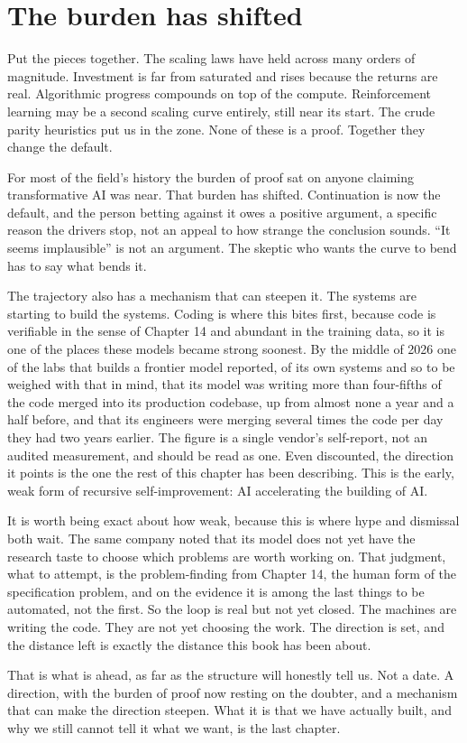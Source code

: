 \section*{The burden has shifted}

Put the pieces together. The scaling laws have held across many orders of magnitude. Investment is far from saturated and rises because the returns are real. Algorithmic progress compounds on top of the compute. Reinforcement learning may be a second scaling curve entirely, still near its start. The crude parity heuristics put us in the zone. None of these is a proof. Together they change the default.

For most of the field's history the burden of proof sat on anyone claiming transformative AI was near. That burden has shifted. Continuation is now the default, and the person betting against it owes a positive argument, a specific reason the drivers stop, not an appeal to how strange the conclusion sounds. ``It seems implausible'' is not an argument. The skeptic who wants the curve to bend has to say what bends it.

The trajectory also has a mechanism that can steepen it. The systems are starting to build the systems. Coding is where this bites first, because code is verifiable in the sense of Chapter 14 and abundant in the training data, so it is one of the places these models became strong soonest. By the middle of 2026 one of the labs that builds a frontier model reported, of its own systems and so to be weighed with that in mind, that its model was writing more than four-fifths of the code merged into its production codebase, up from almost none a year and a half before, and that its engineers were merging several times the code per day they had two years earlier. The figure is a single vendor's self-report, not an audited measurement, and should be read as one. Even discounted, the direction it points is the one the rest of this chapter has been describing. This is the early, weak form of recursive self-improvement: AI accelerating the building of AI.

It is worth being exact about how weak, because this is where hype and dismissal both wait. The same company noted that its model does not yet have the research taste to choose which problems are worth working on. That judgment, what to attempt, is the problem-finding from Chapter 14, the human form of the specification problem, and on the evidence it is among the last things to be automated, not the first. So the loop is real but not yet closed. The machines are writing the code. They are not yet choosing the work. The direction is set, and the distance left is exactly the distance this book has been about.

That is what is ahead, as far as the structure will honestly tell us. Not a date. A direction, with the burden of proof now resting on the doubter, and a mechanism that can make the direction steepen. What it is that we have actually built, and why we still cannot tell it what we want, is the last chapter.
